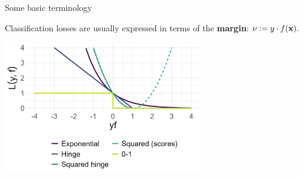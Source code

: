 \documentclass[11pt,compress,t,notes=noshow, xcolor=table]{beamer}
\begin{document}
\begin{vbframe}{Some basic terminology}


Classification losses are usually expressed in terms of the 
  \textbf{margin}: $\nu := y \cdot f(\mathbf{x}).$

\vfill

\begin{minipage}[b]{1\textwidth}
  \includegraphics[width=0.65\textwidth]{figure/overview_classif.png}
  \tiny \centering
\end{minipage}%


\end{vbframe}
\end{document}
